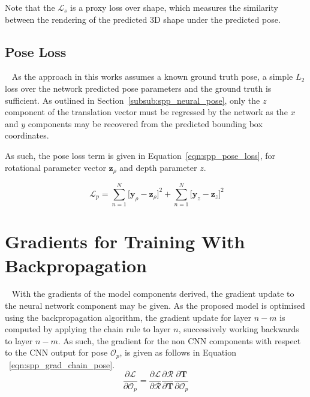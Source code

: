 Note that the \( \mathcal{L}_{s} \) is a proxy loss over shape, which measures the similarity between 
the rendering of the predicted 3D shape under the predicted pose.

\subsection{Pose Loss}
~\label{sec:spp_pose_loss}
As the approach in this works assumes a known ground truth pose, a simple \( L_{2} \) loss over the 
network predicted pose parameters and the ground truth is sufficient. As outlined in Section~\ref{subsub:spp_neural_pose}, 
only the \( z \) component of the translation vector must be regressed by the network as the \( x \) and 
\( y \) components may be recovered from the predicted bounding box coordinates.

As such, the pose loss term is given in Equation~\ref{eqn:spp_pose_loss}, for rotational parameter vector 
\( \bm{z}_{\rho} \) and depth parameter \( z \).

\begin{equation}
  ~\label{eqn:spp_pose_loss}
  \mathcal{L}_{p} = \sum_{n=1}^{N} \Big[ \bm{y}_{\rho} - \bm{z}_{\rho} \Big]^{2} +
  \sum_{n=1}^{N} \Big[ \bm{y}_{z} - \bm{z}_{z} \Big]^{2}
\end{equation}

\section{Gradients for Training With Backpropagation}
~\label{sec:spp_backprop}
With the gradients of the model components derived, the gradient update to the neural network component 
may be given. As the proposed model is optimised using the backpropagation algorithm, 
the gradient update for layer \( n - m \) is computed by applying the chain rule to layer \( n \), 
successively working backwards to layer \( n - m \). As such, the gradient for the non CNN components 
with respect to the CNN output for pose \( \mathcal{O}_{p} \), is given as follows in Equation
~\ref{eqn:spp_grad_chain_pose}.
\begin{equation}
  \label{eqn:spp_grad_chain_pose}
  \frac{\partial \mathcal{L}}{\partial \mathcal{O}_{p}} = 
    \frac{\partial \mathcal{L}}{\partial \mathcal{R}}
    \frac{\partial \mathcal{R}}{\partial \bm{T}}
    \frac{\partial \bm{T}}{\partial \mathcal{O}_{p}}
\end{equation}

